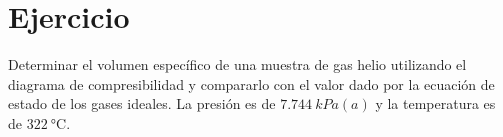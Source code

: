 \section{Ejercicio}\label{ej:Chap03Ejercicio10}
Determinar el volumen específico de una muestra de gas helio utilizando el diagrama de compresibilidad y compararlo con el valor dado por la ecuación de estado de los gases ideales. La presión es de $\SI{7.744}{kPa(a)}$ y la temperatura es de $\SI{322}{\celsius}$.